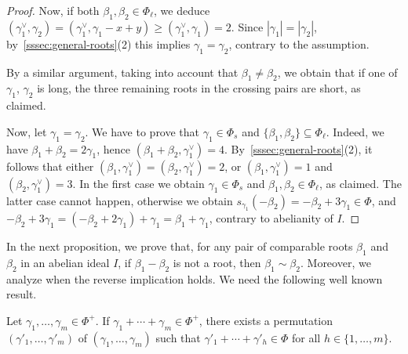 \documentclass[ALCO,published]{cedram}
\theoremstyle{plain}
\newcommand\be{\beta}
\newcommand\ga{\gamma}
\begin{document}
\begin{proof}
\par
Now, if both $\be_1, \be_2\in \Phi_\ell$, we deduce $(\ga_1^\vee, \ga_2)=(\ga_1^\vee, \ga_1-x+y)\geq (\ga_1^\vee, \ga_1)=2$. 
Since $|\ga_1|=|\ga_2|$,  by~\ref{sssec:general-roots}(2) this implies $\ga_1=\ga_2$, contrary to the assumption.

\par
By a similar argument, taking into account that $\be_1\neq \be_2$, we obtain that if one of $\ga_1$, $\ga_2$ is long, the three remaining roots in the crossing pairs are short, as claimed.

\par 
Now, let $\ga_1=\ga_2$. 
We have to prove that $\ga_1\in \Phi_s$ and $\{\be_1, \be_2\}\subseteq\Phi_\ell$.
Indeed, we have $\be_1+\be_2=2\ga_1$, hence $(\be_1+\be_2, \ga_1^\vee)=4$. 
By~\ref{sssec:general-roots}(2), it follows that either $(\be_1,\ga_1^\vee)=(\be_2,\ga_1^\vee)=2$,
or $(\be_1,\ga_1^\vee)=1$ and $(\be_2,\ga_1^\vee)=3$. 
In the first case we obtain $\ga_1\in \Phi_s$ and $\be_1, \be_2\in \Phi_\ell$, as claimed.
The latter case cannot happen, otherwise we obtain $s_{\ga_1}(-\be_2)=-\be_2+3\ga_1\in \Phi$, and $-\be_2+3\ga_1=(-\be_2+2\ga_1)+\ga_1=\be_1+\ga_1$, contrary to abelianity of $I$.
\end{proof}

In the next proposition, we prove that, for any pair of comparable roots $\be_1$ and $\be_2$ in an abelian ideal $I$, if $\be_1-\be_2$ is  not a root, then $\be_1\sim \be_2$. 
Moreover, we analyze when the reverse implication holds. 
We need the following well known result. 

\begin{lem}\label{lem:somme-bou}
Let $\ga_1,\dots, \ga_m\in \Phi^+$. 
If  $\ga_1+\cdots+\ga_m\in \Phi^+$, 
there exists a permutation $(\ga'_1, \dots, \ga'_m)$ of $(\ga_1, \dots,\ga_m)$ such that $\ga'_{1}+\cdots+\ga'_{h}\in \Phi$ for all $h\in\{1, \dots, m\}$. 
\end{lem}
\end{document}
